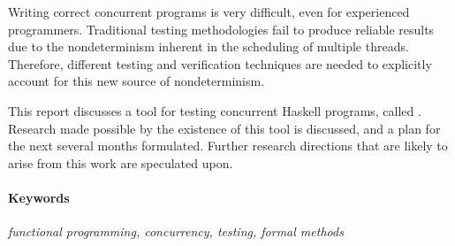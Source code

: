 Writing correct concurrent programs is very difficult, even for
experienced programmers. Traditional testing methodologies fail to
produce reliable results due to the nondeterminism inherent in the
scheduling of multiple threads. Therefore, different testing and
verification techniques are needed to explicitly account for this new
source of nondeterminism.

This report discusses a tool for testing concurrent Haskell programs,
called \dejafu{}. Research made possible by the existence of this tool
is discussed, and a plan for the next several months
formulated. Further research directions that are likely to arise from
this work are speculated upon.

\vfill

\paragraph{Keywords}

\textit{functional programming, concurrency,
  testing, formal methods}